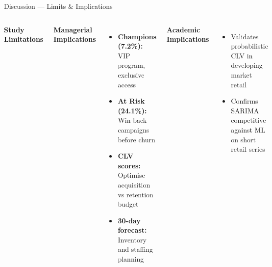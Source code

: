 \documentclass[aspectratio=169,12pt]{beamer}
\begin{document}
\begin{frame}{Discussion --- Limits \& Implications}
\begin{columns}[t]
  \textbf{\color{PumaRed}\small Study Limitations}\\[2pt]

  \textbf{\color{PumaRed}\small Managerial Implications}
  \begin{itemize}\scriptsize
    \item \textbf{Champions (7.2\%):} VIP program, exclusive access
    \item \textbf{At Risk (24.1\%):} Win-back campaigns before churn
    \item \textbf{CLV scores:} Optimise acquisition vs retention budget
    \item \textbf{30-day forecast:} Inventory and staffing planning
  \end{itemize}
  \vspace{2pt}
  \textbf{\color{PumaRed}\small Academic Implications}
  \begin{itemize}\scriptsize
    \item Validates probabilistic CLV in developing market retail
    \item Confirms SARIMA competitive against ML on short retail series
  \end{itemize}
\end{columns}
\end{frame}
\end{document}
